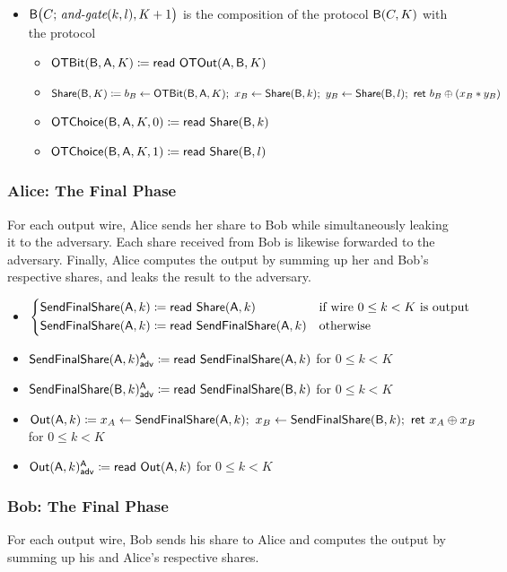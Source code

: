 \begin{itemize}
\item $\mathsf{B}\big(C; \, \textit{and-gate}(k,l),K+1\big)$ is the composition of the protocol $\mathsf{B}(C,K)$ with the protocol
\begin{itemize}
\item $\mathsf{OTBit}(\mathsf{B},\mathsf{A},K) \coloneqq \mathsf{read} \ \mathsf{OTOut}(\mathsf{A},\mathsf{B},K)$\smallskip
\item $\mathsf{Share}(\mathsf{B},K) \coloneqq b_B \leftarrow \mathsf{OTBit}(\mathsf{B},\mathsf{A},K); \ x_B \leftarrow \mathsf{Share}(\mathsf{B},k); \ y_B \leftarrow \mathsf{Share}(\mathsf{B},l); \ \mathsf{ret} \ b_B \oplus (x_B * y_B)$\smallskip
\item $\mathsf{OTChoice}(\mathsf{B},\mathsf{A},K,0) \coloneqq \mathsf{read} \ \mathsf{Share}(\mathsf{B},k)$
\item $\mathsf{OTChoice}(\mathsf{B},\mathsf{A},K,1) \coloneqq \mathsf{read} \ \mathsf{Share}(\mathsf{B},l)$
\end{itemize}
\end{itemize}

\subsubsection{Alice: The Final Phase}
For each output wire, Alice sends her share to Bob while simultaneously leaking it to the adversary. Each share received from Bob is likewise forwarded to the adversary. Finally, Alice computes the output by summing up her and Bob's respective shares, and leaks the result to the adversary.

\begin{itemize}
\item $\begin{cases*} \SendFinalShare(\A,k) \coloneqq \read{\Share(\A,k)} & \text{if wire $0 \leq k < K$ is output} \\ \SendFinalShare(\A,k) \coloneqq \read{\SendFinalShare(\A,k)} & \text{otherwise} \end{cases*}$
\item {\color{blue} $\mathsf{SendFinalShare}(\mathsf{A},k)^{\mathsf{A}}_{\mathsf{adv}} \coloneqq \mathsf{read} \ \mathsf{SendFinalShare}(\mathsf{A},k)$ for $0 \leq k < K$}
\item {\color{blue} $\mathsf{SendFinalShare}(\mathsf{B},k)^{\mathsf{A}}_{\mathsf{adv}} \coloneqq \mathsf{read} \ \mathsf{SendFinalShare}(\mathsf{B},k)$ for $0 \leq k < K$}
\item $\Out(\A,k) \coloneqq x_A \leftarrow \SendFinalShare(\A,k); \ x_B \leftarrow \SendFinalShare(\B,k); \ \ret{x_A \oplus x_B}$ for $0 \leq k < K$
\item {\color{blue} $\mathsf{Out}(\mathsf{A},k)^{\mathsf{A}}_{\mathsf{adv}} \coloneqq \mathsf{read} \ \mathsf{Out}(\mathsf{A},k)$ for $0 \leq k < K$}
\end{itemize}

\subsubsection{Bob: The Final Phase}
For each output wire, Bob sends his share to Alice and computes the output by summing up his and Alice's respective shares.

